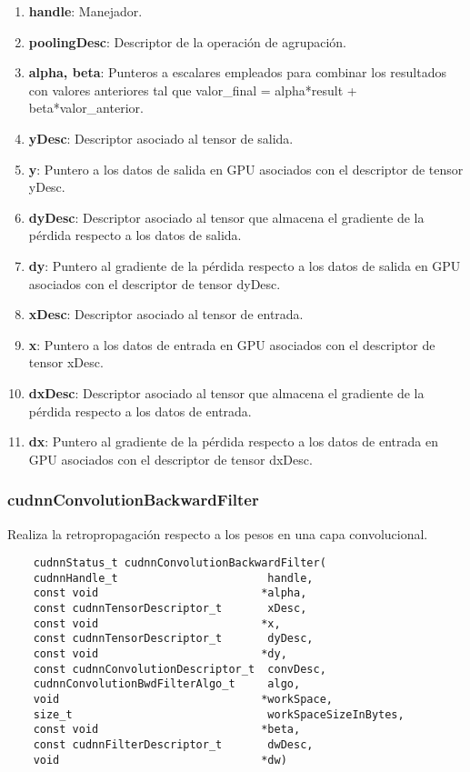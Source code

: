 \begin{enumerate}
	\item \textbf{handle}: Manejador.
	\item \textbf{poolingDesc}: Descriptor de la operación de agrupación.
	\item \textbf{alpha, beta}: Punteros a escalares empleados para combinar los resultados con valores anteriores tal que valor\_final = alpha*result + beta*valor\_anterior.
	\item \textbf{yDesc}: Descriptor asociado al tensor de salida.
	\item \textbf{y}: Puntero a los datos de salida en GPU asociados con el descriptor de tensor yDesc.
	\item \textbf{dyDesc}: Descriptor asociado al tensor que almacena el gradiente de la pérdida respecto a los datos de salida.
	\item \textbf{dy}: Puntero al gradiente de la pérdida respecto a los datos de salida en GPU asociados con el descriptor de tensor dyDesc.
	\item \textbf{xDesc}: Descriptor asociado al tensor de entrada.
	\item \textbf{x}: Puntero a los datos de entrada en GPU asociados con el descriptor de tensor xDesc.
	\item \textbf{dxDesc}: Descriptor asociado al tensor que almacena el gradiente de la pérdida respecto a los datos de entrada.
	\item \textbf{dx}: Puntero al gradiente de la pérdida respecto a los datos de entrada en GPU asociados con el descriptor de tensor dxDesc.	
\end{enumerate}
\cite{cuDNN_pool_fwd}

\subsubsection{cudnnConvolutionBackwardFilter} \label{cudnnConvolutionBackwardFilter}
Realiza la retropropagación respecto a los pesos en una capa convolucional.

\begin{verbatim}
	cudnnStatus_t cudnnConvolutionBackwardFilter(
	cudnnHandle_t                       handle,
	const void                         *alpha,
	const cudnnTensorDescriptor_t       xDesc,
	const void                         *x,
	const cudnnTensorDescriptor_t       dyDesc,
	const void                         *dy,
	const cudnnConvolutionDescriptor_t  convDesc,
	cudnnConvolutionBwdFilterAlgo_t     algo,
	void                               *workSpace,
	size_t                              workSpaceSizeInBytes,
	const void                         *beta,
	const cudnnFilterDescriptor_t       dwDesc,
	void                               *dw)
\end{verbatim}

